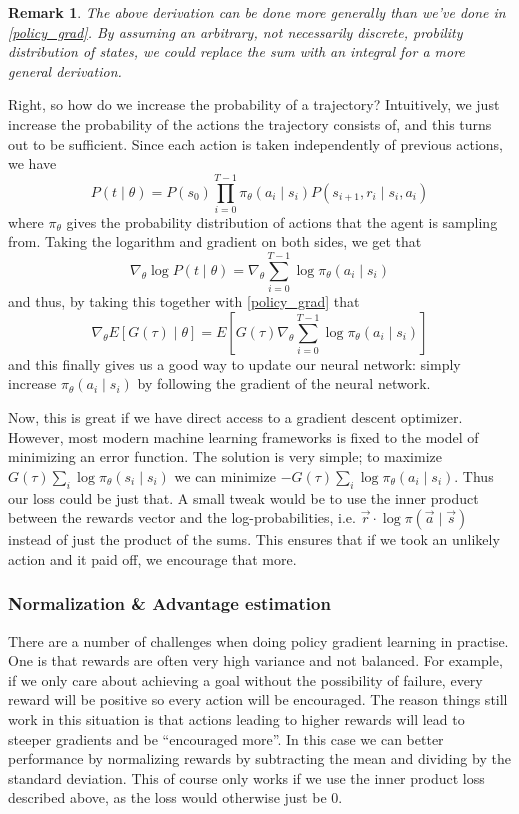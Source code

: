 \documentclass{article}
\theoremstyle{changedot}
\theoremstyle{changedotbreak}
\theoremstyle{nonumberplain}
\newtheorem{remark}{Remark}
\begin{document}
\begin{remark}
  The above derivation can be done more generally than we've done in \ref{policy_grad}. By assuming an arbitrary, not necessarily discrete, probility distribution of states, we could replace the sum with an integral for a more general derivation.
\end{remark}

Right, so how do we increase the probability of a trajectory? Intuitively, we just increase the probability of the actions the trajectory consists of, and this turns out to be sufficient. Since each action is taken independently of previous actions, we have \[P(t \mid \theta) = P(s_{0}) \prod_{i=0}^{T-1} \pi_{\theta}(a_{i} \mid s_{i}) P(s_{i+1}, r_{i} \mid s_{i}, a_{i})\] where $\pi_{\theta}$ gives the probability distribution of actions that the agent is sampling from. Taking the logarithm and gradient on both sides, we get that \[\nabla_{\theta} \log P(t \mid \theta) = \nabla_{\theta} \sum_{i=0}^{T-1} \log \pi_{\theta}(a_{i} \mid s_{i})\] and thus, by taking this together with \ref{policy_grad} that \[\nabla_{\theta} E[G(\tau) \mid \theta] = E\left[ G(\tau) \nabla_{\theta} \sum_{i=0}^{T-1} \log \pi_{\theta} (a_{i} \mid s_{i}) \right]\] and this finally gives us a good way to update our neural network: simply increase $\pi_{\theta} (a_{i} \mid s_{i})$ by following the gradient of the neural network.



Now, this is great if we have direct access to a gradient descent optimizer. However, most modern machine learning frameworks is fixed to the model of minimizing an error function. The solution is very simple; to maximize $G(\tau) \sum_{i} \log \pi_{\theta} (s_{i} \mid s_{i})$ we can minimize $-G(\tau) \sum_{i} \log \pi_{\theta} (a_{i} \mid s_{i})$. Thus our loss could be just that. A small tweak would be to use the inner product between the rewards vector and the log-probabilities, i.e. $\overrightarrow r \cdot {\log \pi(\overrightarrow a \mid \overrightarrow s)}$ instead of just the product of the sums. This ensures that if we took an unlikely action and it paid off, we encourage that more.

\subsubsection{Normalization \& Advantage estimation}
There are a number of challenges when doing policy gradient learning in practise. One is that rewards are often very high variance and not balanced. For example, if we only care about achieving a goal without the possibility of failure, every reward will be positive so every action will be encouraged. The reason things still work in this situation is that actions leading to higher rewards will lead to steeper gradients and be ``encouraged more''. In this case we can better performance by normalizing rewards by subtracting the mean and dividing by the standard deviation. This of course only works if we use the inner product loss described above, as the loss would otherwise just be 0.
\end{document}
